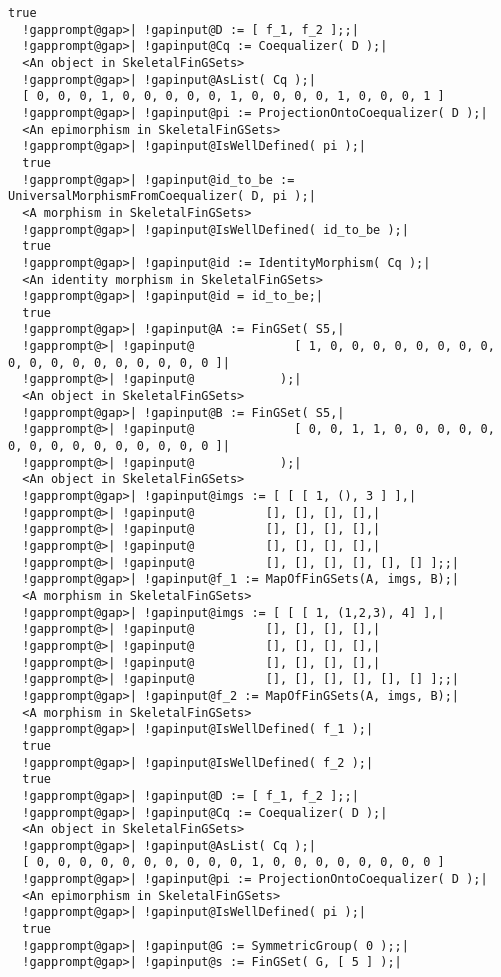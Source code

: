 \documentclass[a4paper,11pt]{report}
\begin{document}
{{{\begin{Verbatim}[commandchars=!@|,fontsize=\small,frame=single,label=Example]
  true
  !gapprompt@gap>| !gapinput@D := [ f_1, f_2 ];;|
  !gapprompt@gap>| !gapinput@Cq := Coequalizer( D );|
  <An object in SkeletalFinGSets>
  !gapprompt@gap>| !gapinput@AsList( Cq );|
  [ 0, 0, 0, 1, 0, 0, 0, 0, 0, 1, 0, 0, 0, 0, 1, 0, 0, 0, 1 ]
  !gapprompt@gap>| !gapinput@pi := ProjectionOntoCoequalizer( D );|
  <An epimorphism in SkeletalFinGSets>
  !gapprompt@gap>| !gapinput@IsWellDefined( pi );|
  true
  !gapprompt@gap>| !gapinput@id_to_be := UniversalMorphismFromCoequalizer( D, pi );|
  <A morphism in SkeletalFinGSets>
  !gapprompt@gap>| !gapinput@IsWellDefined( id_to_be );|
  true
  !gapprompt@gap>| !gapinput@id := IdentityMorphism( Cq );|
  <An identity morphism in SkeletalFinGSets>
  !gapprompt@gap>| !gapinput@id = id_to_be;|
  true
  !gapprompt@gap>| !gapinput@A := FinGSet( S5,|
  !gapprompt@>| !gapinput@              [ 1, 0, 0, 0, 0, 0, 0, 0, 0, 0, 0, 0, 0, 0, 0, 0, 0, 0, 0 ]|
  !gapprompt@>| !gapinput@            );|
  <An object in SkeletalFinGSets>
  !gapprompt@gap>| !gapinput@B := FinGSet( S5,|
  !gapprompt@>| !gapinput@              [ 0, 0, 1, 1, 0, 0, 0, 0, 0, 0, 0, 0, 0, 0, 0, 0, 0, 0, 0 ]|
  !gapprompt@>| !gapinput@            );|
  <An object in SkeletalFinGSets>
  !gapprompt@gap>| !gapinput@imgs := [ [ [ 1, (), 3 ] ],|
  !gapprompt@>| !gapinput@          [], [], [], [],|
  !gapprompt@>| !gapinput@          [], [], [], [],|
  !gapprompt@>| !gapinput@          [], [], [], [],|
  !gapprompt@>| !gapinput@          [], [], [], [], [], [] ];;|
  !gapprompt@gap>| !gapinput@f_1 := MapOfFinGSets(A, imgs, B);|
  <A morphism in SkeletalFinGSets>
  !gapprompt@gap>| !gapinput@imgs := [ [ [ 1, (1,2,3), 4] ],|
  !gapprompt@>| !gapinput@          [], [], [], [],|
  !gapprompt@>| !gapinput@          [], [], [], [],|
  !gapprompt@>| !gapinput@          [], [], [], [],|
  !gapprompt@>| !gapinput@          [], [], [], [], [], [] ];;|
  !gapprompt@gap>| !gapinput@f_2 := MapOfFinGSets(A, imgs, B);|
  <A morphism in SkeletalFinGSets>
  !gapprompt@gap>| !gapinput@IsWellDefined( f_1 );|
  true
  !gapprompt@gap>| !gapinput@IsWellDefined( f_2 );|
  true
  !gapprompt@gap>| !gapinput@D := [ f_1, f_2 ];;|
  !gapprompt@gap>| !gapinput@Cq := Coequalizer( D );|
  <An object in SkeletalFinGSets>
  !gapprompt@gap>| !gapinput@AsList( Cq );|
  [ 0, 0, 0, 0, 0, 0, 0, 0, 0, 0, 1, 0, 0, 0, 0, 0, 0, 0, 0 ]
  !gapprompt@gap>| !gapinput@pi := ProjectionOntoCoequalizer( D );|
  <An epimorphism in SkeletalFinGSets>
  !gapprompt@gap>| !gapinput@IsWellDefined( pi );|
  true
  !gapprompt@gap>| !gapinput@G := SymmetricGroup( 0 );;|
  !gapprompt@gap>| !gapinput@s := FinGSet( G, [ 5 ] );|

\end{Verbatim}}}}
\end{document}

